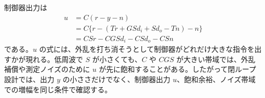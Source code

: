 制御器出力は
\begin{align}
  u&=C(r-y-n)\\
  &=C\{r-(Tr+GSd_i+Sd_o-Tn)-n\}\\
  &=CSr-CGSd_i-CSd_o-CSn
\end{align}
である。$u$ の式には、外乱を打ち消そうとして制御器がどれだけ大きな指令を出すかが現れる。低周波で $S$ が小さくても、$C$ や $CGS$ が大きい帯域では、外乱補償や測定ノイズのために $u$ が先に飽和することがある。したがって閉ループ設計では、出力 $y$ の小ささだけでなく、制御器出力 $u$、飽和余裕、ノイズ帯域での増幅を同じ条件で確認する。
